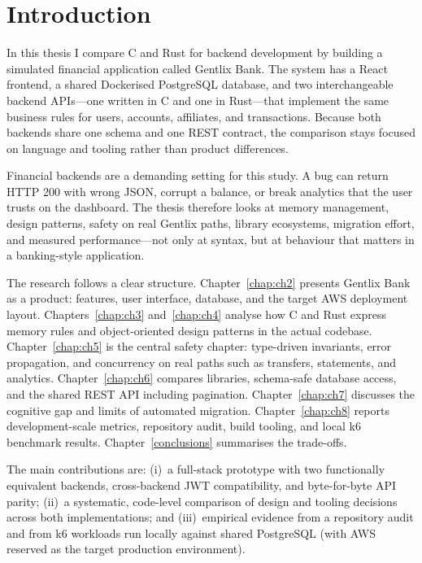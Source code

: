 \chapter{Introduction}

\label{intro}

\par In this thesis I compare C and Rust for backend development by building a simulated financial application called Gentlix Bank. The system has a React frontend, a shared Dockerised PostgreSQL database, and two interchangeable backend APIs---one written in C and one in Rust---that implement the same business rules for users, accounts, affiliates, and transactions. Because both backends share one schema and one REST contract, the comparison stays focused on language and tooling rather than product differences.

\par Financial backends are a demanding setting for this study. A bug can return HTTP 200 with wrong JSON, corrupt a balance, or break analytics that the user trusts on the dashboard. The thesis therefore looks at memory management, design patterns, safety on real Gentlix paths, library ecosystems, migration effort, and measured performance---not only at syntax, but at behaviour that matters in a banking-style application.

\par The research follows a clear structure. Chapter~\ref{chap:ch2} presents Gentlix Bank as a product: features, user interface, database, and the target AWS deployment layout. Chapters~\ref{chap:ch3} and~\ref{chap:ch4} analyse how C and Rust express memory rules and object-oriented design patterns in the actual codebase. Chapter~\ref{chap:ch5} is the central safety chapter: type-driven invariants, error propagation, and concurrency on real paths such as transfers, statements, and analytics. Chapter~\ref{chap:ch6} compares libraries, schema-safe database access, and the shared REST API including pagination. Chapter~\ref{chap:ch7} discusses the cognitive gap and limits of automated migration. Chapter~\ref{chap:ch8} reports development-scale metrics, repository audit, build tooling, and local k6 benchmark results. Chapter~\ref{conclusions} summarises the trade-offs.

\par The main contributions are: (i)~a full-stack prototype with two functionally equivalent backends, cross-backend JWT compatibility, and byte-for-byte API parity; (ii)~a systematic, code-level comparison of design and tooling decisions across both implementations; and (iii)~empirical evidence from a repository audit and from k6 workloads run locally against shared PostgreSQL (with AWS reserved as the target production environment).

